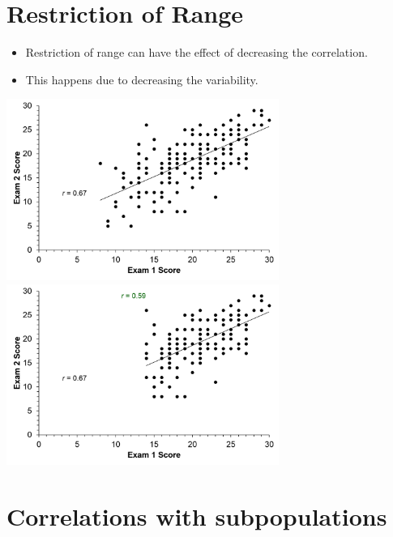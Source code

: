 \documentclass[12pt]{article}
\begin{document}
\section{Restriction of Range}\label{restriction-of-range}

\begin{itemize}
\itemsep1pt\parskip0pt
\item
  Restriction of range can have the effect of decreasing the
  correlation.
\item
  This happens due to decreasing the variability.
\end{itemize}

\includegraphics[width=3.5in]{restriction_range1.png}
\includegraphics[width=3.5in]{restriction_range2.png}

\section{Correlations with
subpopulations}\label{correlations-with-subpopulations}
\end{document}

